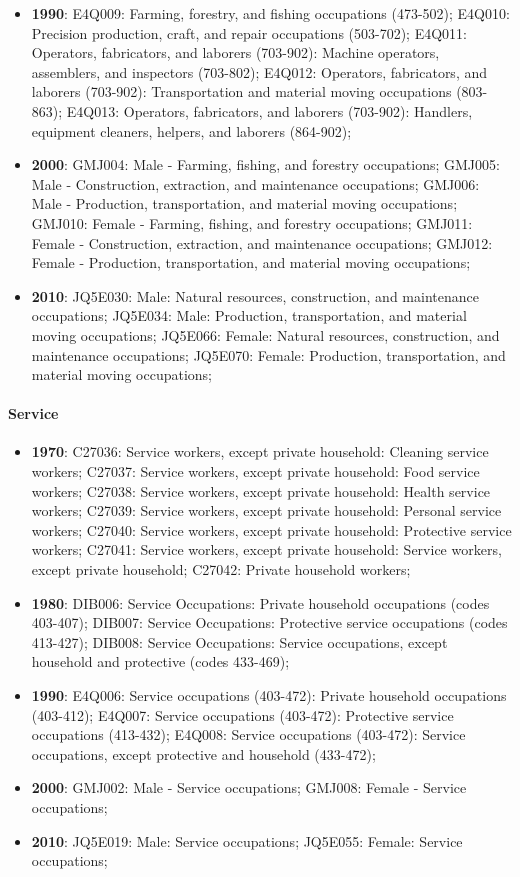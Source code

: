\documentclass[a4paper]{article}
\begin{document}
\begin{itemize}
   \item{\textbf{1990}:  E4Q009: Farming, forestry, and fishing occupations (473-502); E4Q010: Precision production, craft, and repair occupations (503-702); E4Q011: Operators, fabricators, and laborers (703-902): Machine operators, assemblers, and inspectors (703-802); E4Q012: Operators, fabricators, and laborers (703-902): Transportation and material moving occupations (803-863); E4Q013: Operators, fabricators, and laborers (703-902): Handlers, equipment cleaners, helpers, and laborers (864-902);}
   \item{\textbf{2000}:  GMJ004: Male - Farming, fishing, and forestry occupations; GMJ005: Male - Construction, extraction, and maintenance occupations; GMJ006: Male - Production, transportation, and material moving occupations; GMJ010: Female - Farming, fishing, and forestry occupations; GMJ011: Female - Construction, extraction, and maintenance occupations; GMJ012: Female - Production, transportation, and material moving occupations;}
   \item{\textbf{2010}:  JQ5E030: Male: Natural resources, construction, and maintenance occupations; JQ5E034: Male: Production, transportation, and material moving occupations; JQ5E066: Female: Natural resources, construction, and maintenance occupations; JQ5E070: Female: Production, transportation, and material moving occupations;}
\end{itemize}

\paragraph{Service}
\begin{itemize}
   \item{\textbf{1970}:  C27036: Service workers, except private household: Cleaning service workers; C27037: Service workers, except private household: Food service workers; C27038: Service workers, except private household: Health service workers; C27039: Service workers, except private household: Personal service workers; C27040: Service workers, except private household: Protective service workers; C27041: Service workers, except private household: Service workers, except private household; C27042: Private household workers;}
   \item{\textbf{1980}:  DIB006: Service Occupations: Private household occupations (codes 403-407); DIB007: Service Occupations: Protective service occupations (codes 413-427); DIB008: Service Occupations: Service occupations, except household and protective (codes 433-469);}
   \item{\textbf{1990}:  E4Q006: Service occupations (403-472): Private household occupations (403-412); E4Q007: Service occupations (403-472): Protective service occupations (413-432); E4Q008: Service occupations (403-472): Service occupations, except protective and household (433-472);}
   \item{\textbf{2000}:  GMJ002: Male - Service occupations; GMJ008: Female - Service occupations;}
   \item{\textbf{2010}:  JQ5E019: Male: Service occupations; JQ5E055: Female: Service occupations;}
\end{itemize}
\end{document}
